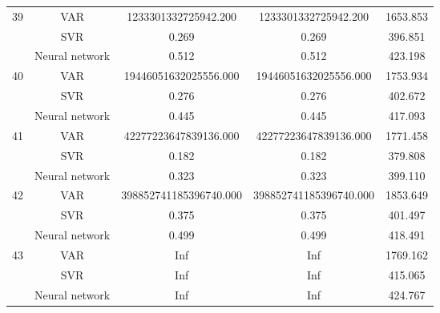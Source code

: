 \documentclass[12pt]{article}
\begin{document}
\begin{longtable}{|p{2cm}|c|c|c|c|}
\cline{2-5}
\hline
\multirow{3}{*}{39} &VAR &   1233301332725942.200 &    1233301332725942.200 &    1653.853\\
\cline{2-5}
 &SVR &   0.269 &    0.269 &    396.851\\
\cline{2-5}
 &Neural network &   0.512 &    0.512 &    423.198\\
\cline{2-5}
\hline
\multirow{3}{*}{40} &VAR &   19446051632025556.000 &    19446051632025556.000 &    1753.934\\
\cline{2-5}
 &SVR &   0.276 &    0.276 &    402.672\\
\cline{2-5}
 &Neural network &   0.445 &    0.445 &    417.093\\
\cline{2-5}
\hline
\multirow{3}{*}{41} &VAR &   42277223647839136.000 &    42277223647839136.000 &    1771.458\\
\cline{2-5}
 &SVR &   0.182 &    0.182 &    379.808\\
\cline{2-5}
 &Neural network &   0.323 &    0.323 &    399.110\\
\cline{2-5}
\hline
\multirow{3}{*}{42} &VAR &   398852741185396740.000 &    398852741185396740.000 &    1853.649\\
\cline{2-5}
 &SVR &   0.375 &    0.375 &    401.497\\
\cline{2-5}
 &Neural network &   0.499 &    0.499 &    418.491\\
\cline{2-5}
\hline
\multirow{3}{*}{43} &VAR &   Inf &    Inf &    1769.162\\
\cline{2-5}
 &SVR &   Inf &    Inf &    415.065\\
\cline{2-5}
 &Neural network &   Inf &    Inf &    424.767\\
\cline{2-5}
\hline
\end{longtable}
\end{document}
